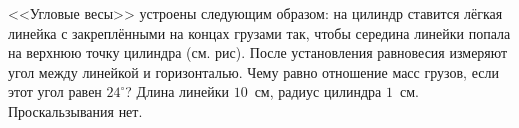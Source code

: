 <<Угловые весы>> устроены следующим образом: на цилиндр ставится лёгкая линейка с закреплёнными на концах грузами так, чтобы середина линейки попала на верхнюю точку цилиндра (см. рис). После установления равновесия измеряют угол между линейкой и горизонталью. Чему равно отношение масс грузов, если этот угол равен $24^\circ$? Длина линейки $10$~см, радиус цилиндра $1$~см. Проскальзывания нет.
